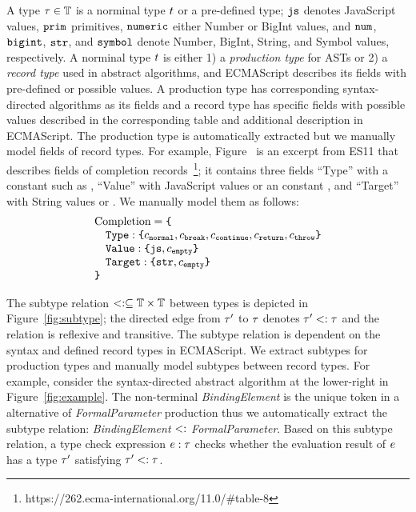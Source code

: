 A type $\tau \in \mathbb{T}$ is a norminal type $t$ or a pre-defined type;
$\texttt{js}$ denotes JavaScript values, $\texttt{prim}$ primitives, $\texttt{numeric}$ either Number
or BigInt values, and $\texttt{num}$, $\texttt{bigint}$, $\texttt{str}$, and $\texttt{symbol}$ denote Number,
BigInt, String, and Symbol values, respectively.  A norminal type $t$ is
either 1) a \textit{production type} for ASTs or 2) a \textit{record type} used
in abstract algorithms, and ECMAScript describes its fields with pre-defined or
possible values.  A production type has corresponding syntax-directed algorithms
as its fields and a record type has specific fields with possible values
described in the corresponding table and additional description in ECMAScript.
The production type is automatically extracted but we manually model fields of
record types.  For example, Figure~\label{fig:record-fields-table} is an excerpt
from ES11 that describes fields of completion
records~\footnote{https://262.ecma-international.org/11.0/\#table-8}; it
contains three fields ``Type'' with a constant such as , ``Value''
with JavaScript values or an constant , and ``Target'' with String
values or .  We manually model them as follows:
\small
\[
  \begin{array}{l}
    \text{Completion} = \texttt{\{}\\
    \quad \texttt{Type}: \texttt{\{} c_{\texttt{normal}}, c_{\texttt{break}}, c_{\texttt{continue}},
    c_{\texttt{return}}, c_{\texttt{throw}} \texttt{\}}\\
    \quad \texttt{Value}: \texttt{\{} \texttt{js}, c_{\texttt{empty}} \texttt{\}}\\
    \quad \texttt{Target}: \texttt{\{} \texttt{str}, c_{\texttt{empty}} \texttt{\}}\\
    \texttt{\}}\\
  \end{array}
\]

The subtype relation $<: \subseteq \mathbb{T} \times \mathbb{T}$ between types is
depicted in Figure~\ref{fig:subtype}; the directed edge from $\tau'$ to $\tau$
denotes $\tau' <: \tau$ and the relation is reflexive and transitive.  The
subtype relation is dependent on the syntax and defined record types in
ECMAScript.  We extract subtypes for production types and manually model
subtypes between record types.  For example, consider the syntax-directed
abstract algorithm at the lower-right in Figure~\ref{fig:example}.  The
non-terminal \textit{BindingElement} is the unique token in a alternative of
\textit{FormalParameter} production thus we automatically extract the subtype
relation: \textit{BindingElement} $<:$ \textit{FormalParameter}.  Based on
this subtype relation, a type check expression $e: \tau$ checks whether the
evaluation result of $e$ has a type $\tau'$ satisfying $\tau' <: \tau$.

